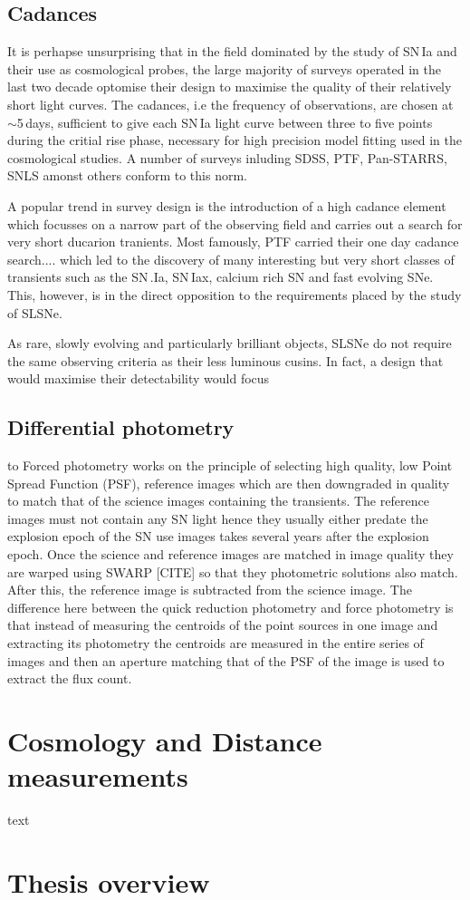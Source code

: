 \subsection{Cadances}
It is perhapse unsurprising that in the field dominated by the study of SN\,Ia and their use as cosmological probes, the large majority of surveys operated in the last two decade optomise their design to maximise the quality of their relatively short light curves. The cadances, i.e the frequency of observations, are chosen at $\sim$5\,days, sufficient to give each SN\,Ia light curve between three to five points during the critial rise phase, necessary for high precision model fitting used in the cosmological studies. A number of surveys inluding SDSS, PTF, Pan-STARRS, SNLS amonst others conform to this norm.

A popular trend in survey design is the introduction of a high cadance element which focusses on a narrow part of the observing field and carries out a search for very short ducarion tranients. Most famously, PTF carried their one day cadance search.... which led to the discovery of many interesting but very short classes of transients such as the SN\,.Ia, SN\,Iax, calcium rich SN and fast evolving SNe. This, however, is in the direct opposition to the requirements placed by the study of SLSNe.

As rare, slowly evolving and particularly brilliant objects, SLSNe do not require the same observing criteria as their less luminous cusins. In fact, a design that would maximise their detectability would focus       



\subsection{Differential photometry}
to Forced photometry works on the principle of selecting high quality, low Point Spread Function (PSF), reference images which are then downgraded in quality to match that of the science images containing the transients. The reference images must not contain any SN light hence they usually either predate the explosion epoch of the SN use images takes several years after the explosion epoch. Once the science and reference images are matched in image quality they are warped using SWARP [CITE] so that they photometric solutions also match. After this, the reference image is subtracted from the science image. The difference here between the quick reduction photometry and force photometry is that instead of measuring the centroids of the point sources in one image and extracting its photometry the centroids are measured in the entire series of images and then an aperture matching that of the PSF of the image is used to extract the flux count.

\section{Cosmology and Distance measurements}
text

\section{Thesis overview}
